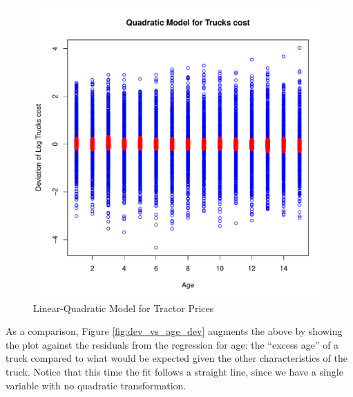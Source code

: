 \documentclass[11pt]{paper}
\begin{document}
\begin{figure}[h!]
  \centering
  \includegraphics[scale = 0.5, keepaspectratio=true]{../Figures/dev_vs_age}
  \caption{Linear-Quadratic Model for Tractor Prices} \label{fig:dev_vs_age}
\end{figure}



\pagebreak
As a comparison, Figure \ref{fig:dev_vs_age_dev} 
augments the above by showing the plot against the 
residuals from the regression for age:
the ``excess age'' of a truck compared to what would be 
expected given the other characteristics of the truck. 
Notice that this time the fit follows a straight line,
since we have a single variable with no
quadratic transformation.
\end{document}
